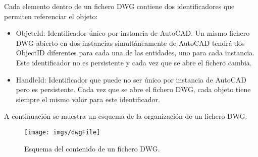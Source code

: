 Cada elemento dentro de un fichero DWG contiene dos identificadores que permiten referenciar el objeto:

\begin{itemize}

\item{ObjetcId: Identificador único por instancia de AutoCAD. Un mismo fichero DWG abierto en dos instancias simultáneamente de AutoCAD tendrá dos ObjectID diferentes para cada una de las entidades, uno para cada instancia. Este identificador no es persistente y cada vez que se abre el fichero cambia.}

\item{HandleId: Identificador que puede no ser único por instancia de AutoCAD pero es persistente. Cada vez que se abre el fichero DWG, cada objeto tiene siempre el mismo valor para este identificador.}

\end{itemize}

A continuación se muestra un esquema de la organización de un fichero DWG:

\begin{figure}[h]
\begin{center}
\texttt{[image: imgs/dwgFile]}
\caption{Esquema del contenido de un fichero DWG.}
\end{center}
\end{figure}




